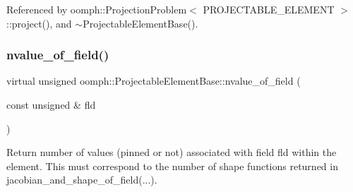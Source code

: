 Referenced by oomph\+::\+Projection\+Problem$<$ P\+R\+O\+J\+E\+C\+T\+A\+B\+L\+E\+\_\+\+E\+L\+E\+M\+E\+N\+T $>$\+::project(), and $\sim$\+Projectable\+Element\+Base().

\mbox{\label{classoomph_1_1ProjectableElementBase_a1a9a6de16f3511bca8e8be770abb9c2e}} 
\subsubsection{\texorpdfstring{nvalue\+\_\+of\+\_\+field()}{nvalue\_of\_field()}}
{\footnotesize\ttfamily virtual unsigned oomph\+::\+Projectable\+Element\+Base\+::nvalue\+\_\+of\+\_\+field (\begin{DoxyParamCaption}\item[{const unsigned \&}]{fld }\end{DoxyParamCaption})\hspace{0.3cm}{\ttfamily [pure virtual]}}



Return number of values (pinned or not) associated with field fld within the element. This must correspond to the number of shape functions returned in jacobian\+\_\+and\+\_\+shape\+\_\+of\+\_\+field(...). 



